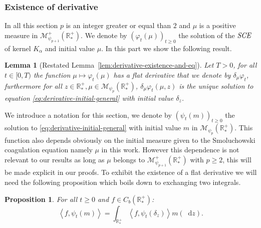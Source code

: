 \documentclass[11pt,a4paper]{article}
\newcommand{\RRP}{\mathbb{R}^+_*}
\newcommand{\MC}{\mathcal{M}}
\newcommand{\SCE}{\emph{SCE}}
\newcommand{\Proc}[1]{\left(#1\right)_{t\geq 0}}
\newcommand{\brac}[1]{\left\langle#1\right\rangle}
\newcommand{\dd}{\mathop{}\!\mathrm{d}}
\newtheorem{lemma}[theorem]{Lemma}
\newtheorem{proposition}[theorem]{Proposition}
\begin{document}
\subsubsection{Existence of derivative}
In all this section $p$ is an integer greater or equal than $2$ and $\mu$ is a positive measure in $\MC^+_{\psi_{p+1}}(\RRP)$. We denote by $\Proc{\varphi_t(\mu)}$ the solution of the $\SCE$ of kernel $K_\alpha$ and initial value $\mu$. In this part we show the following result.
\begin{lemma}[Restated Lemma~\ref{lem:derivative-existence-and-eq}]
    Let $T > 0$, for all $t \in [0,T)$ the function $ \mu \mapsto \varphi_t(\mu)$ has a flat derivative that we denote by $\delta_\mu\varphi_t$, furthermore for all $z \in \RRP, \mu \in \MC_{\psi_p}(\RRP)$, $\delta_\mu\varphi_t(\mu,z)$ is the unique solution to equation \eqref{eq:derivative-initial-general} with initial value $\delta_z$.
\end{lemma}
We introduce a notation for this section, we denote by $\Proc{\psi_t(m)}$ the solution to \eqref{eq:derivative-initial-general} with initial value $m$ in $\MC_{\psi_p}(\RRP)$. This function also depends obviously on the initial measure given to the Smoluchowski coagulation equation namely $\mu$ in this work. However this dependence is not relevant to our results as long as $\mu$ belongs to $\MC^+_{\psi_{p+1}}(\RRP)$ with $p\geq 2$, this will be made explicit in our proofs. To exhibit the existence of a flat derivative we will need the following proposition which boils down to exchanging two integrals.
\begin{proposition}\label{prop:derivative-prop-fubini}
    For all $t \geq 0$ and $f \in C_b(\RRP)$:
    \[\brac{f,\psi_t(m)} = \int_{\RRP} \brac{f,\psi_t\left(\delta_z\right)}m(\dd z).\]
\end{proposition}
\end{document}
